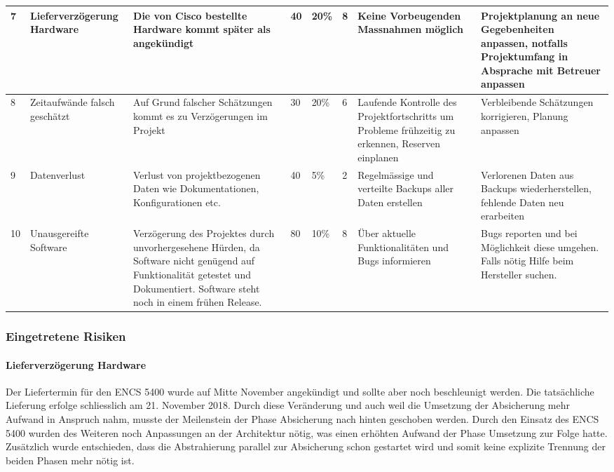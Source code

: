 \begin{landscape}
\begin{longtable}{|m{0.5cm}|m{3cm}|m{5cm}|m{0.75cm}|m{0.75cm}|m{0.75cm}|m{5cm}|m{5cm}|}
	\hline
	7 & Lieferverzögerung Hardware & Die von Cisco bestellte Hardware kommt später als angekündigt & 40 & 20\% & 8 & Keine Vorbeugenden Massnahmen möglich & Projektplanung an neue Gegebenheiten anpassen, notfalls Projektumfang in Absprache mit Betreuer anpassen \\
	\hline
	8 & Zeitaufwände falsch geschätzt & Auf Grund falscher Schätzungen kommt es zu Verzögerungen im Projekt & 30 & 20\% & 6 & Laufende Kontrolle des Projektfortschritts um Probleme frühzeitig zu erkennen, Reserven einplanen & Verbleibende Schätzungen korrigieren, Planung anpassen \\
	\hline
	9 & Datenverlust & Verlust von projektbezogenen Daten wie Dokumentationen, Konfigurationen etc. & 40 & 5\% & 2 & Regelmässige und verteilte Backups aller Daten erstellen & Verlorenen Daten aus Backups wiederherstellen, fehlende Daten neu erarbeiten \\
	\hline
	10 & Unausgereifte Software & Verzögerung des Projektes durch unvorhergesehene Hürden, da Software nicht genügend auf Funktionalität getestet und Dokumentiert. Software steht noch in einem frühen Release. & 80 & 10\% & 8 & Über aktuelle Funktionalitäten und Bugs informieren & Bugs reporten und bei Möglichkeit diese umgehen. Falls nötig Hilfe beim Hersteller suchen. \\
	\hline
\end{longtable}

\end{landscape}



\subsubsection{Eingetretene Risiken}

\paragraph{Lieferverzögerung Hardware} 
Der Liefertermin für den ENCS 5400 wurde auf Mitte November angekündigt und sollte aber noch beschleunigt werden. Die tatsächliche Lieferung erfolge schliesslich am 21. November 2018. Durch diese Veränderung und auch weil die Umsetzung der Absicherung mehr Aufwand in Anspruch nahm, musste der Meilenstein der Phase Absicherung nach hinten geschoben werden. Durch den Einsatz des ENCS 5400 wurden des Weiteren noch Anpassungen an der Architektur nötig, was einen erhöhten Aufwand der Phase Umsetzung zur Folge hatte. Zusätzlich wurde entschieden, dass die Abstrahierung parallel zur Absicherung schon gestartet wird und somit keine explizite Trennung der beiden Phasen mehr nötig ist.

